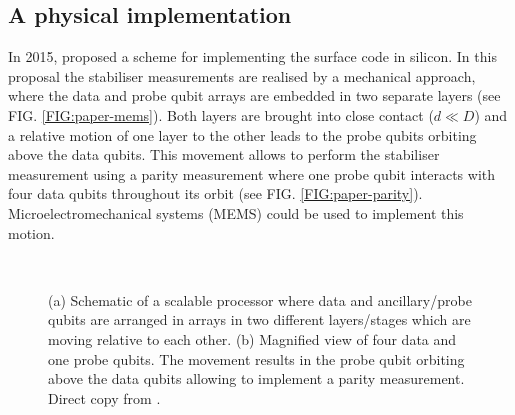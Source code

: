 \subsection{A physical implementation} \label{sec:PhysicalImplementation}
In 2015, \citet{OGorman2016} proposed a scheme for implementing the surface code in silicon. In this proposal the stabiliser measurements are realised by a mechanical approach, where the data and probe qubit arrays are embedded in two separate layers (see FIG. \ref{FIG:paper-mems}). Both layers are brought into close contact ($d\ll D$) and a relative motion of one layer to the other leads to the probe qubits orbiting above the data qubits. This movement allows to perform the stabiliser measurement using a parity measurement where one probe qubit interacts with four data qubits throughout its orbit (see FIG. \ref{FIG:paper-parity}). Microelectromechanical systems (MEMS) could be used to implement this motion.


\begin{figure}[H]
	\centering
	\\
	\caption[paper]{(a) Schematic of a scalable processor where data and ancillary/probe qubits are arranged in arrays in two different layers/stages which are moving relative to each other. (b) Magnified view of four data and one probe qubits. The movement results in the probe qubit orbiting above the data qubits allowing to implement a parity measurement. Direct copy from \cite{OGorman2016}.}
	\label{FIG:paper}
\end{figure}

